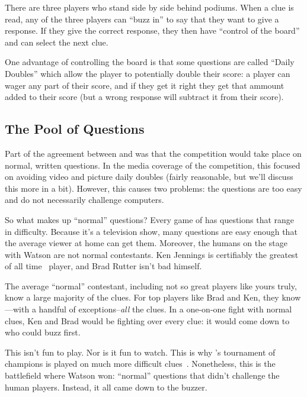 There are three players who stand side by side behind podiums.
%
When a clue is read, any of the three players can ``buzz in'' to say
that they want to give a response.
%
If they give the correct response, they then have ``control of the
board'' and can select the next clue.

One advantage of controlling the board is that some questions are
called ``Daily Doubles'' which allow the player to potentially double
their score: a player can wager any part of their score, and if they
get it right they get that ammount added to their score (but a wrong
response will subtract it from their score).

\subsection{The Pool of Questions}


Part of the agreement between \jeopardy{} and  was that the
competition would take place on normal, written questions.
%
In the media coverage of the competition, this focused on avoiding
video and picture daily doubles (fairly reasonable, but we'll discuss
this more in a bit).
%
However, this causes two problems: the questions are too easy and do
not necessarily challenge computers.

So what makes up ``normal'' questions?
%
Every game of \jeopardy{} has questions that range in difficulty.
%
Because it's a television show, many questions are easy enough that
the average viewer at home can get them.
%
Moreover, the humans on the stage with Watson are not normal contestants.
%
Ken Jennings is certifiably the greatest of all
time~\citep[]{low-20} \jeopardy{} player, and Brad Rutter
isn't bad himself.

The average ``normal'' \jeopardy{} contestant, including not so great
players like yours truly, know a large majority of the clues.
%
For top players like Brad and Ken, they know---with a handful of
exceptions--\emph{all} the clues.
%
In a one-on-one fight with normal clues, Ken and Brad would be
fighting over every clue: it would come down to who could buzz first.

This isn't fun to play.
%
Nor is it fun to watch.
%
This is why \jeopardyp{}'s tournament of champions is played on much
more difficult clues~\citep{harris-06}.
%
Nonetheless, this is the battlefield where Watson won: ``normal''
questions that didn't challenge the human players.
%
Instead, it all came down to the buzzer.

